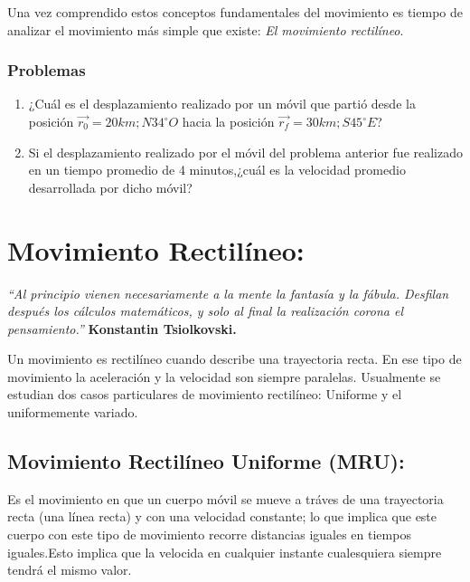 \documentclass[a5paper,pagesize,10pt,bibtotoc,pointlessnumbers,
normalheadings,DIV=9,fleqn,x11names,table,twoside=false]{scrbook}
\begin{document}
Una vez comprendido estos conceptos fundamentales del movimiento es tiempo de analizar el movimiento más simple que existe: 
\textit{El movimiento rectilíneo}.

\subsection*{Problemas}

\begin{enumerate}
 \item ¿Cuál es el desplazamiento realizado por un móvil que partió desde la posición $\vec{r_0} = 20 km;N34^\circ O$ hacia la 
posición $\vec{r_f} = 30 km; S45^\circ E$? 

\item Si el desplazamiento realizado por el móvil del problema anterior fue realizado en un tiempo promedio de 4 minutos,¿cuál es 
la velocidad promedio desarrollada por dicho móvil?

\end{enumerate}






\chapter{Movimiento Rectilíneo:}

\textit{``Al principio vienen necesariamente a la mente la fantasía y la fábula. Desfilan después los cálculos matemáticos, y solo 
al final la realización corona el pensamiento.''} \textbf{Konstantin Tsiolkovski.} 
\vspace{1.0 cm}

Un movimiento es rectilíneo cuando describe una trayectoria recta. En ese tipo de movimiento la aceleración y la velocidad son 
siempre paralelas. Usualmente se estudian dos casos particulares de movimiento rectilíneo: Uniforme y el uniformemente variado.

\section{Movimiento Rectilíneo Uniforme (MRU):}
 
Es el movimiento en que un cuerpo móvil se mueve a tráves de una trayectoria recta (una línea recta) y con una velocidad 
constante; lo que implica que este cuerpo con este tipo de movimiento recorre distancias iguales en tiempos iguales.Esto implica 
que la velocida en cualquier instante cualesquiera siempre
 tendrá el mismo valor.\\
\end{document}
